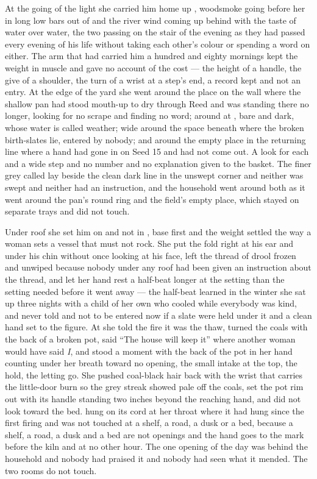 At the going of the light she carried him home up , woodsmoke going before her in long low bars out of  and the river wind coming up behind with the taste of water over water, the two passing on the stair of the evening as they had passed every evening of his life without taking each other's colour or spending a word on either. The arm that had carried him a hundred and eighty mornings kept the weight in muscle and gave no account of the cost --- the height of a handle, the give of a shoulder, the turn of a wrist at a step's end, a record kept and not an entry. At the edge of the yard she went around the place on the wall where the shallow pan had stood mouth-up to dry through Reed and was standing there no longer, looking for no scrape and finding no word; around  at , bare and dark, whose water is called weather; wide around the space beneath  where the broken birth-slates lie, entered by nobody; and around the empty place in the returning line where a hand had gone in on Seed 15 and had not come out. A look for each and a wide step and no number and no explanation given to the basket. The finer grey called  lay beside the clean dark line in the unswept corner and neither was swept and neither had an instruction, and the household went around both as it went around the pan's round ring and the field's empty place, which stayed on separate trays and did not touch.

Under  roof she set him on  and not in , base first and the weight settled the way a woman sets a vessel that must not rock. She put the fold right at his ear and under his chin without once looking at his face, left the thread of drool frozen and unwiped because nobody under any roof had been given an instruction about the thread, and let her hand rest a half-beat longer at the setting than the setting needed before it went away --- the half-beat learned in the winter she sat up three nights with a child of her own who cooled while everybody was kind, and never told and not to be entered now if a slate were held under it and a clean hand set to the figure. At  she told the fire it was the thaw, turned the coals with the back of a broken pot, said “The house will keep it” where another woman would have said \emph{I}, and stood a moment with the back of the pot in her hand counting under her breath toward no opening, the small intake at the top, the hold, the letting go. She pushed coal-black hair back with the wrist that carries the little-door burn so the grey streak showed pale off the coals, set the pot rim out with its handle standing two inches beyond the reaching hand, and did not look toward the bed.  hung on its cord at her throat where it had hung since the first firing and was not touched at a shelf, a road, a dusk or a bed, because a shelf, a road, a dusk and a bed are not openings and the hand goes to the mark before the kiln and at no other hour. The one opening of the day was behind the household and nobody had praised it and nobody had seen what it mended. The two rooms do not touch.

